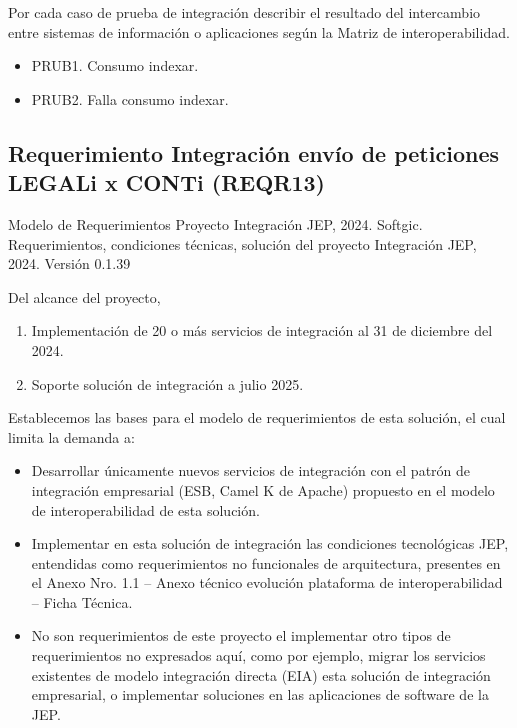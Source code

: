 \documentclass[
  paper=a4,
  ,captions=tableheading
]{scrartcl}
\providecommand{\tightlist}{%
  \setlength{\itemsep}{0pt}\setlength{\parskip}{0pt}}
\renewenvironment{quote}{\begin{customblockquote}\list{}{\rightmargin=0em\leftmargin=0em}%
\item\relax\color{blockquote-text}\ignorespaces}{\unskip\unskip\endlist\end{customblockquote}}
\begin{document}
Por cada caso de prueba de integración describir el resultado del
intercambio entre sistemas de información o aplicaciones según la Matriz
de interoperabilidad.

\begin{itemize}
\tightlist
\item
  PRUB1. Consumo indexar.
\item
  PRUB2. Falla consumo indexar.
\end{itemize}

\subsection{Requerimiento Integración envío de peticiones LEGALi x CONTi
(REQR13)}\label{sec:requerimiento-integraciuxf3n-envuxedo-de-peticiones-legali-x-conti-reqr13}

\begin{quote}
Modelo de Requerimientos Proyecto Integración JEP, 2024. Softgic.
Requerimientos, condiciones técnicas, solución del proyecto Integración
JEP, 2024. Versión 0.1.39
\end{quote}

Del alcance del proyecto,

\begin{enumerate}
\def\labelenumi{\arabic{enumi}.}
\tightlist
\item
  Implementación de 20 o más servicios de integración al 31 de diciembre
  del 2024.
\item
  Soporte solución de integración a julio 2025.
\end{enumerate}

Establecemos las bases para el modelo de requerimientos de esta
solución, el cual limita la demanda a:

\begin{itemize}
\tightlist
\item
  Desarrollar únicamente nuevos servicios de integración con el patrón
  de integración empresarial (ESB, Camel K de Apache) propuesto en el
  modelo de interoperabilidad de esta solución.
\item
  Implementar en esta solución de integración las condiciones
  tecnológicas JEP, entendidas como requerimientos no funcionales de
  arquitectura, presentes en el Anexo Nro. 1.1 -- Anexo técnico
  evolución plataforma de interoperabilidad -- Ficha Técnica.
\item
  No son requerimientos de este proyecto el implementar otro tipos de
  requerimientos no expresados aquí, como por ejemplo, migrar los
  servicios existentes de modelo integración directa (EIA) esta solución
  de integración empresarial, o implementar soluciones en las
  aplicaciones de software de la JEP.
\end{itemize}
\end{document}
